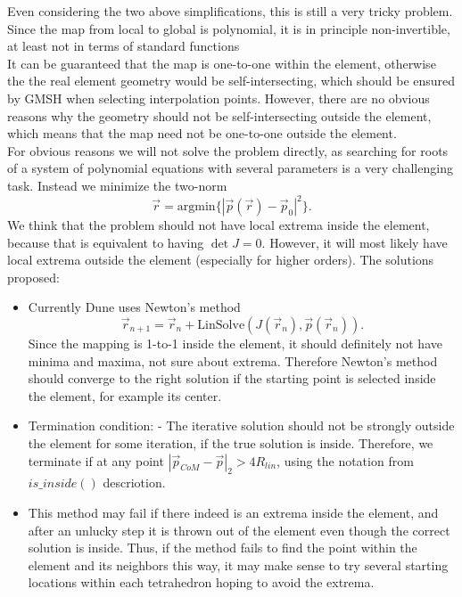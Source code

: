 \documentclass[12pt]{article}
\begin{document}
\noindent
Even considering the two above simplifications, this is still a very tricky problem. Since the map from local to global is polynomial, it is in principle non-invertible, at least not in terms of standard functions \\

\noindent
It can be guaranteed that the map is one-to-one within the element, otherwise the the real element geometry would be self-intersecting, which should be ensured by GMSH when selecting interpolation points. However, there are no obvious reasons why the geometry should not be self-intersecting outside the element, which means that the map need not be one-to-one outside the element. \\

\noindent
For obvious reasons we will not solve the problem directly, as searching for roots of a system of polynomial equations with several parameters is a very challenging task. Instead we minimize the two-norm \[\vec{r} = \mathrm{argmin} \{ |\vec{p}(\vec{r}) - \vec{p}_0 |^2 \}. \] We think that the problem should not have local extrema inside the element, because that is equivalent to having $\det J = 0$. However, it will most likely have local extrema outside the element (especially for higher orders). The solutions proposed:
\begin{itemize}
	\item Currently Dune uses Newton's method \[\vec{r}_{n+1} = \vec{r}_n + \mathrm{LinSolve}(J(\vec{r}_n), \vec{p}(\vec{r}_n) ). \] Since the mapping is 1-to-1 inside the element, it should definitely not have minima and maxima, not sure about extrema. Therefore Newton's method should converge to the right solution if the starting point is selected inside the element, for example its center.
	
	\item Termination condition:
		- The iterative solution should not be strongly outside the element for some iteration, if the true solution is inside. Therefore, we terminate if at any point $|\vec{p}_{CoM} - \vec{p}|_2 > 4 R_{lin}$, using the notation from $is\_inside()$ descriotion.
	
	\item This method may fail if there indeed is an extrema inside the element, and after an unlucky step it is thrown out of the element even though the correct solution is inside. Thus, if the method fails to find the point within the element and its neighbors this way, it may make sense to try several starting locations within each tetrahedron hoping to avoid the extrema.
\end{itemize}
\end{document}
